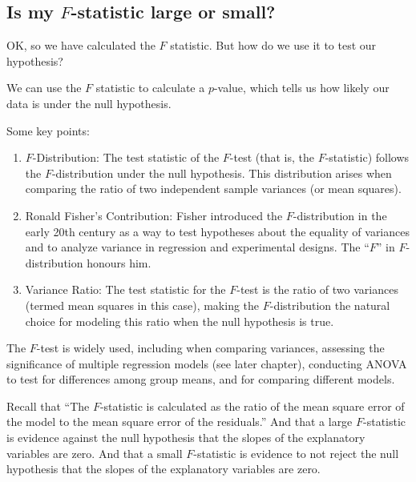 \documentclass[
  letterpaper,
  8pt,
  a4paper]{book}
\providecommand{\tightlist}{%
  \setlength{\itemsep}{0pt}\setlength{\parskip}{0pt}}
\begin{document}
\subsection*{\texorpdfstring{Is my \(F\)-statistic large or
small?}{Is my F-statistic large or small?}}\label{is-my-f-statistic-large-or-small}

OK, so we have calculated the \(F\) statistic. But how do we use it to
test our hypothesis?

We can use the \(F\) statistic to calculate a \(p\)-value, which tells
us how likely our data is under the null hypothesis.

Some key points:

\begin{enumerate}
\def\labelenumi{\arabic{enumi}.}
\tightlist
\item
  \(F\)-Distribution: The test statistic of the \(F\)-test (that is, the
  \(F\)-statistic) follows the \(F\)-distribution under the null
  hypothesis. This distribution arises when comparing the ratio of two
  independent sample variances (or mean squares).
\item
  Ronald Fisher's Contribution: Fisher introduced the \(F\)-distribution
  in the early 20th century as a way to test hypotheses about the
  equality of variances and to analyze variance in regression and
  experimental designs. The ``\(F\)'' in \(F\)-distribution honours him.
\item
  Variance Ratio: The test statistic for the \(F\)-test is the ratio of
  two variances (termed mean squares in this case), making the
  \(F\)-distribution the natural choice for modeling this ratio when the
  null hypothesis is true.
\end{enumerate}

The \(F\)-test is widely used, including when comparing variances,
assessing the significance of multiple regression models (see later
chapter), conducting ANOVA to test for differences among group means,
and for comparing different models.

Recall that ``The \(F\)-statistic is calculated as the ratio of the mean
square error of the model to the mean square error of the residuals.''
And that a large \(F\)-statistic is evidence against the null hypothesis
that the slopes of the explanatory variables are zero. And that a small
\(F\)-statistic is evidence to not reject the null hypothesis that the
slopes of the explanatory variables are zero.
\end{document}
